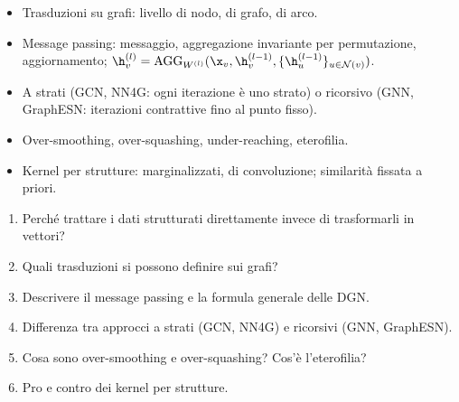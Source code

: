 \begin{puntichiave}
\begin{itemize}
  \item Trasduzioni su grafi: livello di nodo, di grafo, di arco.
  \item Message passing: messaggio, aggregazione invariante per permutazione, aggiornamento;
        $\h_v^{(l)} = \mathrm{AGG}_{W^{(l)}}(\x_v,\h_v^{(l-1)},\{\h_u^{(l-1)}\}_{u\in\mathcal N(v)})$.
  \item A strati (GCN, NN4G: ogni iterazione è uno strato) o ricorsivo (GNN, GraphESN: iterazioni contrattive fino al
        punto fisso).
  \item Over-smoothing, over-squashing, under-reaching, eterofilia.
  \item Kernel per strutture: marginalizzati, di convoluzione; similarità fissata a priori.
\end{itemize}
\end{puntichiave}

\begin{domande}
\begin{enumerate}
  \item Perché trattare i dati strutturati direttamente invece di trasformarli in vettori?
  \item Quali trasduzioni si possono definire sui grafi?
  \item Descrivere il message passing e la formula generale delle DGN.
  \item Differenza tra approcci a strati (GCN, NN4G) e ricorsivi (GNN, GraphESN).
  \item Cosa sono over-smoothing e over-squashing? Cos'è l'eterofilia?
  \item Pro e contro dei kernel per strutture.
\end{enumerate}
\end{domande}
